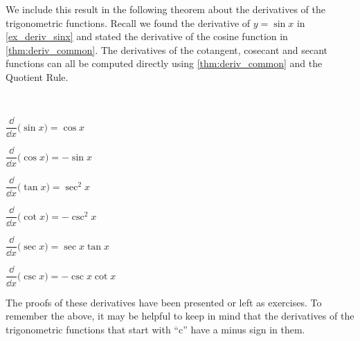 We include this result in the following theorem about the derivatives of the trigonometric functions. Recall we found the derivative of $y=\sin x$ in \autoref{ex_deriv_sinx} and stated the derivative of the cosine function in \autoref{thm:deriv_common}. The derivatives of the cotangent, cosecant and secant functions can all be computed directly using \autoref{thm:deriv_common} and the Quotient Rule.

\begin{theorem}\label{thm:deriv_trig}%
\mbox{}\\[-2\baselineskip]%
\begin{enumext*}[columns=2]
		\item	$\dfrac{\dd}{\dd x}\bigl(\sin x\bigr) = \cos x$
		\item	$\dfrac{\dd}{\dd x}\bigl(\cos x\bigr) = -\sin x$
		\item	$\dfrac{\dd}{\dd x}\bigl(\tan x\bigr) = \sec^2 x$
		\item	$\dfrac{\dd}{\dd x}\bigl(\cot x\bigr) = -\csc^2 x$
		\item	$\dfrac{\dd}{\dd x}\bigl(\sec x\bigr) = \sec x\tan x$
		\item	$\dfrac{\dd}{\dd x}\bigl(\csc x\bigr) = -\csc x\cot x$
\end{enumext*}
\end{theorem}

The proofs of these derivatives have been presented or left as exercises. To remember the above, it may be helpful to keep in mind that the derivatives of the trigonometric functions that start with ``c'' have a minus sign in them.

